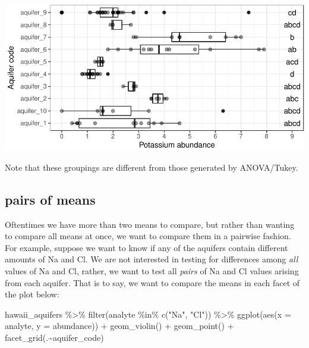 \documentclass[
]{krantz}
\newenvironment{Shaded}{\begin{snugshade}}{\end{snugshade}}
\newcommand{\AttributeTok}[1]{\textcolor[rgb]{0.77,0.63,0.00}{#1}}
\newcommand{\FunctionTok}[1]{\textcolor[rgb]{0.00,0.00,0.00}{#1}}
\newcommand{\NormalTok}[1]{#1}
\newcommand{\SpecialCharTok}[1]{\textcolor[rgb]{0.00,0.00,0.00}{#1}}
\newcommand{\StringTok}[1]{\textcolor[rgb]{0.31,0.60,0.02}{#1}}
\begin{document}
\begin{center}\includegraphics[width=1\linewidth]{index_files/figure-latex/unnamed-chunk-155-1} \end{center}

Note that these groupings are different from those generated by ANOVA/Tukey.

\hypertarget{pairs-of-means}{%
\subsection{pairs of means}\label{pairs-of-means}}

Oftentimes we have more than two means to compare, but rather than wanting to compare all means at once, we want to compare them in a pairwise fashion. For example, suppose we want to know if any of the aquifers contain different amounts of Na and Cl. We are not interested in testing for differences among \emph{all} values of Na and Cl, rather, we want to test all \emph{pairs} of Na and Cl values arising from each aquifer. That is to say, we want to compare the means in each facet of the plot below:

\begin{Shaded}
\begin{Highlighting}[]
\NormalTok{hawaii\_aquifers }\SpecialCharTok{\%\textgreater{}\%}
  \FunctionTok{filter}\NormalTok{(analyte }\SpecialCharTok{\%in\%} \FunctionTok{c}\NormalTok{(}\StringTok{"Na"}\NormalTok{, }\StringTok{"Cl"}\NormalTok{)) }\SpecialCharTok{\%\textgreater{}\%}
  \FunctionTok{ggplot}\NormalTok{(}\FunctionTok{aes}\NormalTok{(}\AttributeTok{x =}\NormalTok{ analyte, }\AttributeTok{y =}\NormalTok{ abundance)) }\SpecialCharTok{+} \FunctionTok{geom\_violin}\NormalTok{() }\SpecialCharTok{+} \FunctionTok{geom\_point}\NormalTok{() }\SpecialCharTok{+} \FunctionTok{facet\_grid}\NormalTok{(.}\SpecialCharTok{\textasciitilde{}}\NormalTok{aquifer\_code)}
\end{Highlighting}
\end{Shaded}
\end{document}
